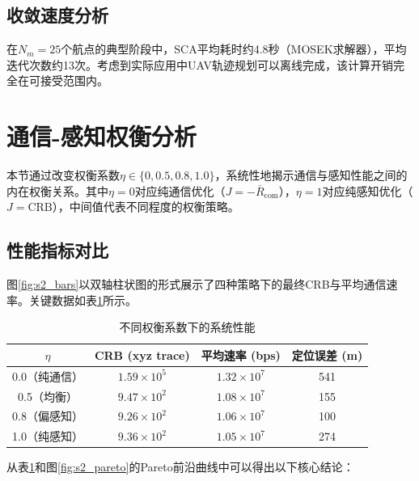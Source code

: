 \subsection{收敛速度分析}

在$N_m=25$个航点的典型阶段中，SCA平均耗时约4.8秒（MOSEK求解器），平均迭代次数约13次。考虑到实际应用中UAV轨迹规划可以离线完成，该计算开销完全在可接受范围内。

\section{通信-感知权衡分析}

本节通过改变权衡系数$\eta\in\{0,0.5,0.8,1.0\}$，系统性地揭示通信与感知性能之间的内在权衡关系。其中$\eta=0$对应纯通信优化（$J=-\bar{R}_{\text{com}}$），$\eta=1$对应纯感知优化（$J=\text{CRB}$），中间值代表不同程度的权衡策略。

\subsection{性能指标对比}

图\ref{fig:s2_bars}以双轴柱状图的形式展示了四种策略下的最终CRB与平均通信速率。关键数据如表\ref{tab:tradeoff}所示。

\begin{table}[htbp]
\centering
\caption{不同权衡系数下的系统性能}
\label{tab:tradeoff}
\begin{tabular}{cccc}
\toprule
$\eta$ & CRB (xyz trace) & 平均速率 (bps) & 定位误差 (m) \\
\midrule
0.0（纯通信） & $1.59\times10^{5}$ & $1.32\times10^{7}$ & 541 \\
0.5（均衡）   & $9.47\times10^{2}$ & $1.08\times10^{7}$ & 155 \\
0.8（偏感知） & $9.26\times10^{2}$ & $1.06\times10^{7}$ & 100 \\
1.0（纯感知） & $9.36\times10^{2}$ & $1.05\times10^{7}$ & 274 \\
\bottomrule
\end{tabular}
\end{table}

从表\ref{tab:tradeoff}和图\ref{fig:s2_pareto}的Pareto前沿曲线中可以得出以下核心结论：

